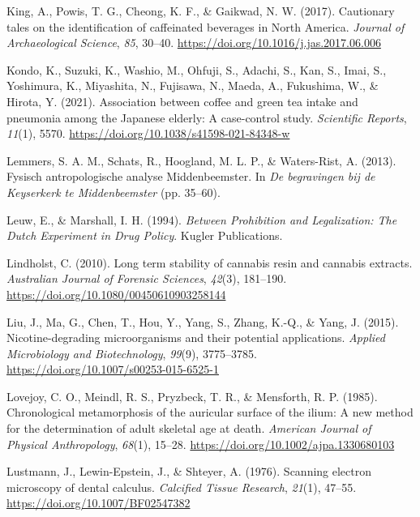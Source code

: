 \documentclass[
  b5paper,
]{book}
\newlength{\cslhangindent}
\newenvironment{CSLReferences}[2] %
 {\begin{list}{}{%
  \setlength{\itemindent}{0pt}
  \setlength{\leftmargin}{0pt}
  \setlength{\parsep}{0pt}
  \ifodd #1
   \setlength{\leftmargin}{\cslhangindent}
   \setlength{\itemindent}{-1\cslhangindent}
  \fi
  \setlength{\itemsep}{#2\baselineskip}}}
 {\end{list}}
\begin{document}
\begin{CSLReferences}{1}{0}
King, A., Powis, T. G., Cheong, K. F., \& Gaikwad, N. W. (2017).
Cautionary tales on the identification of caffeinated beverages in
{North America}. \emph{Journal of Archaeological Science}, \emph{85},
30--40. \url{https://doi.org/10.1016/j.jas.2017.06.006}

Kondo, K., Suzuki, K., Washio, M., Ohfuji, S., Adachi, S., Kan, S.,
Imai, S., Yoshimura, K., Miyashita, N., Fujisawa, N., Maeda, A.,
Fukushima, W., \& Hirota, Y. (2021). Association between coffee and
green tea intake and pneumonia among the {Japanese} elderly: A
case-control study. \emph{Scientific Reports}, \emph{11}(1), 5570.
\url{https://doi.org/10.1038/s41598-021-84348-w}

Lemmers, S. A. M., Schats, R., Hoogland, M. L. P., \& Waters-Rist, A.
(2013). {Fysisch antropologische analyse Middenbeemster}. In \emph{{De
begravingen bij de Keyserkerk te Middenbeemster}} (pp. 35--60).

Leuw, E., \& Marshall, I. H. (1994). \emph{Between {Prohibition} and
{Legalization}: {The Dutch Experiment} in {Drug Policy}}. {Kugler
Publications}.

Lindholst, C. (2010). Long term stability of cannabis resin and cannabis
extracts. \emph{Australian Journal of Forensic Sciences}, \emph{42}(3),
181--190. \url{https://doi.org/10.1080/00450610903258144}

Liu, J., Ma, G., Chen, T., Hou, Y., Yang, S., Zhang, K.-Q., \& Yang, J.
(2015). Nicotine-degrading microorganisms and their potential
applications. \emph{Applied Microbiology and Biotechnology},
\emph{99}(9), 3775--3785.
\url{https://doi.org/10.1007/s00253-015-6525-1}

Lovejoy, C. O., Meindl, R. S., Pryzbeck, T. R., \& Mensforth, R. P.
(1985). Chronological metamorphosis of the auricular surface of the
ilium: {A} new method for the determination of adult skeletal age at
death. \emph{American Journal of Physical Anthropology}, \emph{68}(1),
15--28. \url{https://doi.org/10.1002/ajpa.1330680103}

Lustmann, J., Lewin-Epstein, J., \& Shteyer, A. (1976). Scanning
electron microscopy of dental calculus. \emph{Calcified Tissue
Research}, \emph{21}(1), 47--55.
\url{https://doi.org/10.1007/BF02547382}


\end{CSLReferences}
\end{document}
